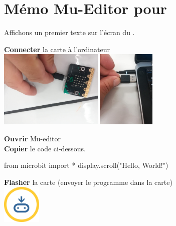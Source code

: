 
\section{Mémo Mu-Editor pour \mbpy}



\begin{methode}
	\begin{multicols}{2}
		Affichons un premier texte sur l'écran du \mb.
	
		\textbf{Connecter} la carte à l'ordinateur
		\\[1em]
		
		\includegraphics[height=10em]{res/mu/005.jpg}
		\includegraphics[height=10em]{res/mu/006.jpg}
		
	\columnbreak


	\textbf{Ouvrir} Mu-editor\\
	\textbf{Copier} le code ci-dessous.

	\begin{mucode}
from microbit import *
display.scroll("Hello, World!")
	\end{mucode}

	\textbf{Flasher} la carte (envoyer le programme dans 
	la carte)\\
	\hfill \includegraphics[width=5em]{res/flash.png}

	\end{multicols}
\end{methode}

